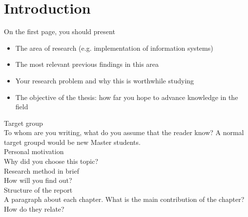 \chapter{Introduction}
  On the first page, you should present
  \begin{itemize}
    \item The area of research (e.g. implementation of information systems)
    \item The most relevant previous findings in this area
    \item Your research problem and why this is worthwhile studying
    \item The objective of the thesis: how far you hope to advance knowledge in the field
  \end{itemize}
  Target group \\
  To whom are you writing, what do you assume that the reader know? A normal target groupd would be 
    new Master students. \\
  Personal motivation \\
  Why did you choose this topic? \\
  Research method in brief \\
  How will you find out? \\
  Structure of the report \\
  A paragraph about each chapter. What is the main contribution of the chapter? How do they relate? \\

